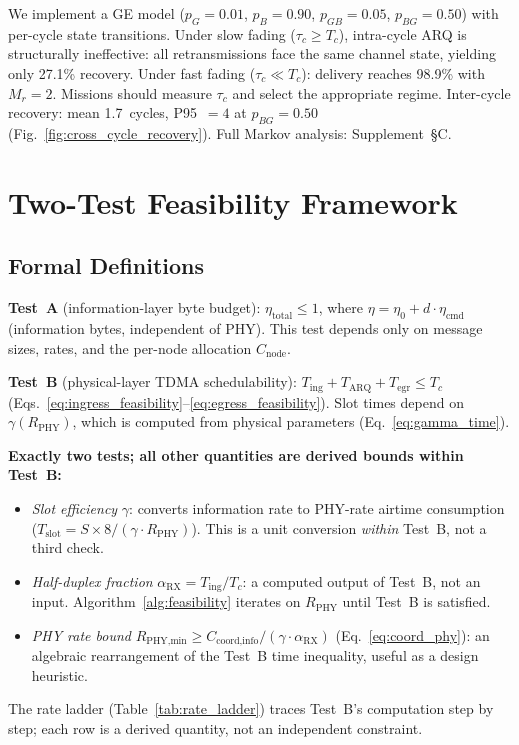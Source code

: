 \documentclass[journal]{IEEEtran}
\begin{document}
We implement a GE model ($p_G = 0.01$, $p_B = 0.90$, $p_{GB} = 0.05$, $p_{BG} = 0.50$) with per-cycle state transitions. Under slow fading ($\tau_c \geq T_c$), intra-cycle ARQ is structurally ineffective: all retransmissions face the same channel state, yielding only 27.1\% recovery. Under fast fading ($\tau_c \ll T_c$): delivery reaches 98.9\% with $M_r = 2$. Missions should measure $\tau_c$ and select the appropriate regime. Inter-cycle recovery: mean 1.7~cycles, P95~$= 4$ at $p_{BG} = 0.50$ (Fig.~\ref{fig:cross_cycle_recovery}). Full Markov analysis: Supplement~\S C.

\section{Two-Test Feasibility Framework}
\label{sec:feasibility_framework}

\subsection{Formal Definitions}

\textbf{Test~A} (information-layer byte budget): $\eta_{\text{total}} \leq 1$, where $\eta = \eta_0 + d \cdot \eta_{\text{cmd}}$ (information bytes, independent of PHY). This test depends only on message sizes, rates, and the per-node allocation $C_{\text{node}}$.

\textbf{Test~B} (physical-layer TDMA schedulability): $T_{\text{ing}} + T_{\text{ARQ}} + T_{\text{egr}} \leq T_c$ (Eqs.~\ref{eq:ingress_feasibility}--\ref{eq:egress_feasibility}). Slot times depend on $\gamma(R_{\text{PHY}})$, which is computed from physical parameters (Eq.~\ref{eq:gamma_time}).

\textbf{Exactly two tests; all other quantities are derived bounds within Test~B:}
\begin{itemize}
    \item \emph{Slot efficiency} $\gamma$: converts information rate to PHY-rate airtime consumption ($T_{\text{slot}} = S \times 8 / (\gamma \cdot R_{\text{PHY}})$). This is a unit conversion \emph{within} Test~B, not a third check.
    \item \emph{Half-duplex fraction} $\alpha_{\text{RX}} = T_{\text{ing}} / T_c$: a computed output of Test~B, not an input. Algorithm~\ref{alg:feasibility} iterates on $R_{\text{PHY}}$ until Test~B is satisfied.
    \item \emph{PHY rate bound} $R_{\text{PHY,min}} \geq C_{\text{coord,info}} / (\gamma \cdot \alpha_{\text{RX}})$ (Eq.~\ref{eq:coord_phy}): an algebraic rearrangement of the Test~B time inequality, useful as a design heuristic.
\end{itemize}
The rate ladder (Table~\ref{tab:rate_ladder}) traces Test~B's computation step by step; each row is a derived quantity, not an independent constraint.
\end{document}
